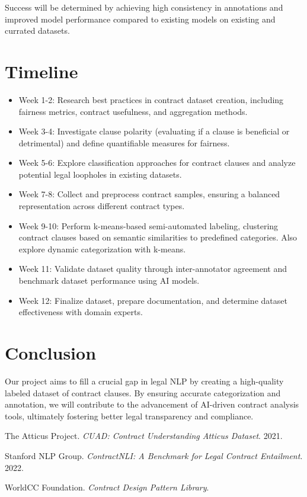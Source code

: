 \documentclass[11pt, oneside]{article}   	%
\begin{document}
Success will be determined by achieving high consistency in annotations and improved model performance compared to existing models on existing and currated datasets.

\section*{Timeline}
\begin{itemize}
	\item Week 1-2: Research best practices in contract dataset creation, including fairness metrics, contract usefulness, and aggregation methods.
	\item Week 3-4: Investigate clause polarity (evaluating if a clause is beneficial or detrimental) and define quantifiable measures for fairness.
	\item Week 5-6: Explore classification approaches for contract clauses and analyze potential legal loopholes in existing datasets.
	\item Week 7-8: Collect and preprocess contract samples, ensuring a balanced representation across different contract types.
	\item Week 9-10: Perform k-means-based semi-automated labeling, clustering contract clauses based on semantic similarities to predefined categories. Also explore dynamic categorization with k-means.
	\item Week 11: Validate dataset quality through inter-annotator agreement and benchmark dataset performance using AI models.
	\item Week 12: Finalize dataset, prepare documentation, and determine dataset effectiveness with domain experts.
\end{itemize}
\section*{Conclusion}
Our project aims to fill a crucial gap in legal NLP by creating a high-quality labeled dataset of contract clauses. By ensuring accurate categorization and annotation, we will contribute to the advancement of AI-driven contract analysis tools, ultimately fostering better legal transparency and compliance.

\begin{thebibliography}{9}

	The Atticus Project.
	\textit{CUAD: Contract Understanding Atticus Dataset}.
	2021.
	
	Stanford NLP Group.
	\textit{ContractNLI: A Benchmark for Legal Contract Entailment}.
	2022.

		WorldCC Foundation.
		\textit{Contract Design Pattern Library}.
		

	\end{thebibliography}
\end{document}

